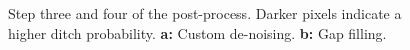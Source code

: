 \documentclass[]{interact}
\theoremstyle{plain}%
\theoremstyle{definition}
\theoremstyle{remark}
\begin{document}
\begin{figure} [!htb]
    \centering
    \hspace{5pt}
    \caption{Step three and four of the post-process. Darker pixels indicate a higher ditch probability. \textbf{a: }Custom de-noising. \textbf{b: }Gap filling.}
    \label{fig:postprocessing2}
\end{figure}
\end{document}

